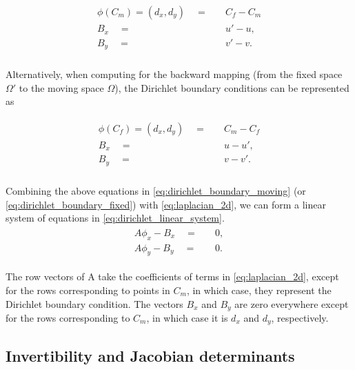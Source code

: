 \begin{align} \label{eq:dirichlet_boundary_moving}
    \begin{split}
    \phi(C_m)  =  (d_x, d_y) \quad = \quad & C_f - C_m \\
    B_x \quad = \quad &  u' - u, \\
    B_y \quad = \quad &  v' - v. \\
    \end{split}
\end{align}

Alternatively, when computing for the backward mapping (from the fixed space $\Omega'$ to the moving space $\Omega$), the Dirichlet boundary conditions can be represented as

\begin{align} \label{eq:dirichlet_boundary_fixed}
    \begin{split}
    \phi(C_f)  =  (d_x, d_y) \quad = \quad & C_m - C_f \\
    B_x \quad = \quad &  u - u', \\
    B_y \quad = \quad &  v - v'. \\
    \end{split}
\end{align}

Combining the above equations in \autoref{eq:dirichlet_boundary_moving} (or \autoref{eq:dirichlet_boundary_fixed}) with \autoref{eq:laplacian_2d}, we can form a linear system of equations in \autoref{eq:dirichlet_linear_system}.
\begin{align} \label{eq:dirichlet_linear_system}
    \begin{split}
    A\phi_x - B_x \quad = \quad & 0, \\
    A\phi_y - B_y \quad = \quad & 0.
    \end{split}
\end{align}   


The row vectors of A take the coefficients of terms in \autoref{eq:laplacian_2d}, except for the rows corresponding to points in $C_m$, in which case, they represent the Dirichlet boundary condition. The vectors $B_x$ and $B_y$ are zero everywhere except for the rows corresponding to $C_m$, in which case it is $d_x$ and $d_y$, respectively. 


\subsection{Invertibility and Jacobian determinants}
\label{sec:jacobian_determinants}

